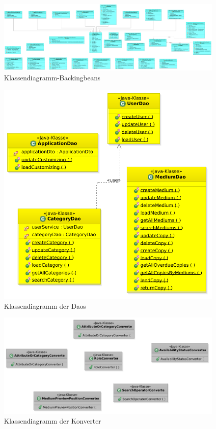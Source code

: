 \documentclass{article}
\begin{document}
\begin{figure}[H]
\hypertarget{Usersession}{}
		\centering
		\includegraphics[width = 52em]{Klassendiagramm-Backingbeans}
		\caption{Klassendiagramm-Backingbeans}
	\end{figure}

\begin{figure}[H]
\hypertarget{DAOs}{}
		\centering
		\includegraphics[width = 52em]{KlassendiagrammDaos}
		\caption{Klassendiagramm der Daos}
	\end{figure}


\begin{figure}[H]
		\centering
		\includegraphics[width = 52em]{Klassendiagramm-Convertors}
		\caption{Klassendiagramm der Konverter}
	\end{figure}
\end{document}

